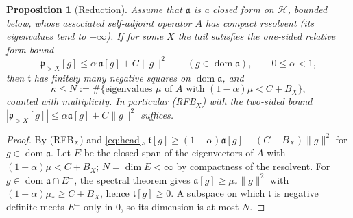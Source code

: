\documentclass[11pt]{amsart}
\newtheorem{proposition}[theorem]{Proposition}
\theoremstyle{definition}
\theoremstyle{remark}
\newcommand{\fa}{\mathfrak a}
\newcommand{\fp}{\mathfrak p}
\newcommand{\ft}{\mathfrak t}
\begin{document}
\begin{proposition}[Reduction]\label{prop:red}
Assume that $\fa$ is a closed form on $\mathcal H$, bounded below, whose
associated self-adjoint operator $A$ has compact resolvent (its eigenvalues
tend to $+\infty$). If for some $X$ the tail satisfies the one-sided relative
form bound
\begin{equation}\tag{RFB$_X$}
\fp_{>X}[g]\le \alpha\,\fa[g]+C\|g\|^2\qquad(g\in\operatorname{dom}\fa),\qquad 0\le\alpha<1,
\end{equation}
then $\ft$ has finitely many negative squares on $\operatorname{dom}\fa$, and
\[
\kappa\le N:=\#\{\text{eigenvalues }\mu\text{ of }A\text{ with }(1-\alpha)\mu<C+B_X\},
\]
counted with multiplicity. In particular (RFB$_X$) with the two-sided bound
$|\fp_{>X}[g]|\le\alpha\fa[g]+C\|g\|^2$ suffices.
\end{proposition}
\begin{proof}
By (RFB$_X$) and \eqref{eq:head},
$\ft[g]\ge(1-\alpha)\fa[g]-(C+B_X)\|g\|^2$ for $g\in\operatorname{dom}\fa$.
Let $E$ be the closed span of the eigenvectors of $A$ with
$(1-\alpha)\mu<C+B_X$; $N=\dim E<\infty$ by compactness of the resolvent. For
$g\in\operatorname{dom}\fa\cap E^\perp$, the spectral theorem gives
$\fa[g]\ge\mu_\ast\|g\|^2$ with $(1-\alpha)\mu_\ast\ge C+B_X$, hence
$\ft[g]\ge0$. A subspace on which $\ft$ is negative definite meets
$E^\perp$ only in $0$, so its dimension is at most $N$.
\end{proof}
\end{document}

